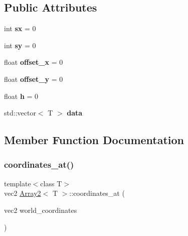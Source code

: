 \subsection*{Public Attributes}
\begin{DoxyCompactItemize}
\item 
\mbox{\label{structArray2_aa940e91649f35c252ede59dad5f75d52}} 
int {\bfseries sx} = 0
\item 
\mbox{\label{structArray2_a6060f402f1cf425325df8a4ea23ac2b4}} 
int {\bfseries sy} = 0
\item 
\mbox{\label{structArray2_a1c0f896b76b9817ab4162aef59644be6}} 
float {\bfseries offset\+\_\+x} = 0
\item 
\mbox{\label{structArray2_aeb90cd45930f8fd1d995dd751b53e8ba}} 
float {\bfseries offset\+\_\+y} = 0
\item 
\mbox{\label{structArray2_adddfcecc3bd577f17240287e63ba0cc4}} 
float {\bfseries h} = 0
\item 
\mbox{\label{structArray2_a2c8d5015d8edb6fc44ecb4d9700f0c4d}} 
std\+::vector$<$ T $>$ {\bfseries data}
\end{DoxyCompactItemize}


\subsection{Member Function Documentation}
\mbox{\label{structArray2_afd1e9be811a27a30290d244fe8fd0e47}} 
\subsubsection{\texorpdfstring{coordinates\_at()}{coordinates\_at()}}
{\footnotesize\ttfamily template$<$class T$>$ \\
vec2 \mbox{\hyperlink{structArray2}{Array2}}$<$ T $>$\+::coordinates\+\_\+at (\begin{DoxyParamCaption}\item[{vec2}]{world\+\_\+coordinates }\end{DoxyParamCaption})\hspace{0.3cm}{\ttfamily [inline]}}



